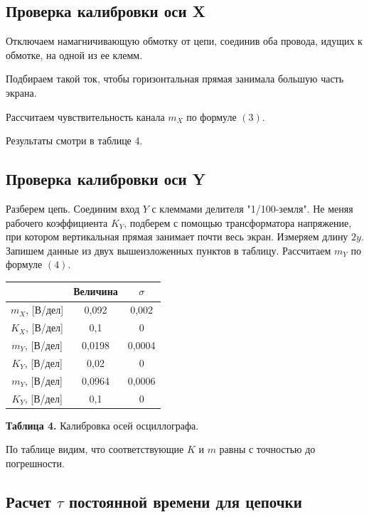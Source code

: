 \documentclass[a4paper, 12pt]{article}%
\begin{document}
\subsection*{Проверка калибровки оси X}

Отключаем намагничивающую обмотку от цепи, соединив оба провода, идущих к обмотке, на одной из ее клемм. 

Подбираем такой ток, чтобы горизонтальная прямая занимала большую часть экрана.

Рассчитаем чувствительность канала $m_X$ по формуле $(3)$. 

Результаты смотри в таблице 4.

\subsection*{Проверка калибровки оси Y}

Разберем цепь. Соединим вход $Y$ с клеммами делителя "1/100-земля". Не меняя рабочего коэффициента $K_Y$, подберем с помощью трансформатора напряжение, при котором вертикальная прямая занимает почти весь экран. Измеряем длину $2y$. Запишем данные из двух вышеизложенных пунктов в таблицу. Рассчитаем $m_Y$ по формуле $(4)$.

\begin{center}
\begin{tabular}{|c|c|c|}
\hline 
 & Величина & $\sigma$ \\  
\hline 
$m_X$, [В/дел] & 0,092 & 0,002 \\ 
\hline 
$K_X$, [В/дел] & 0,1 & 0 \\ 
\hline 
$m_Y$, [В/дел] & 0,0198 & 0,0004 \\ 
\hline 
$K_Y$, [В/дел] & 0,02 & 0 \\ 
\hline 
$m_Y$, [В/дел] & 0,0964 & 0,0006 \\ 
\hline 
$K_Y$, [В/дел] & 0,1 & 0 \\ 
\hline 
\end{tabular}
 
\textbf{Таблица 4.} Калибровка осей осциллографа.
\end{center}

По таблице видим, что соответствующие $K$ и $m$ равны с точностью до погрешности.

\subsection*{Расчет $\tau$ постоянной времени для цепочки}
\end{document}
